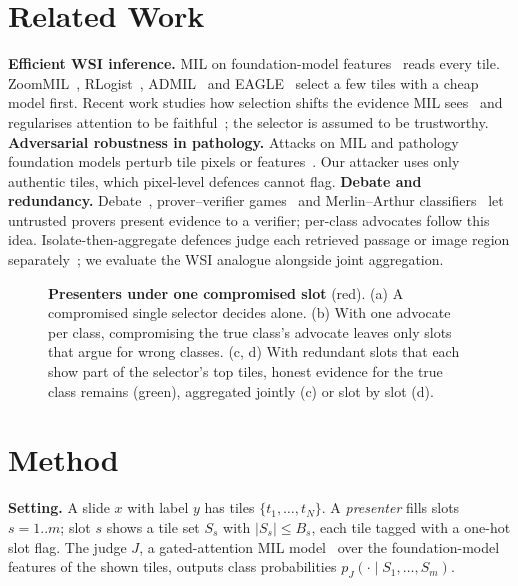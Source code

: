 \documentclass[runningheads]{llncs}
\begin{document}
\section{Related Work}
\textbf{Efficient WSI inference.} MIL on foundation-model features~\cite{ilse2018abmil,lu2021data,shao2021transmil,li2021dual} reads every tile. ZoomMIL~\cite{thandiackal2022zoommil}, RLogist~\cite{zhao2023rlogist}, ADMIL~\cite{admil2026} and EAGLE~\cite{eagle2026} select a few tiles with a cheap model first. Recent work studies how selection shifts the evidence MIL sees~\cite{bagshift2026,foci2026} and regularises attention to be faithful~\cite{gcemil2026,carmil2026}; the selector is assumed to be trustworthy.
\textbf{Adversarial robustness in pathology.} Attacks on MIL and pathology foundation models perturb tile pixels or features~\cite{foote2021now,mil_adv2022,butterfly2025}. Our attacker uses only authentic tiles, which pixel-level defences cannot flag.
\textbf{Debate and redundancy.} Debate~\cite{irving2018debate,khan2024debate}, prover--verifier games~\cite{anil2021pvg} and Merlin--Arthur classifiers~\cite{waldchen2024merlin} let untrusted provers present evidence to a verifier; per-class advocates follow this idea. Isolate-then-aggregate defences judge each retrieved passage or image region separately~\cite{xiang2024robustrag,xiang2022patchcleanser}; we evaluate the WSI analogue alongside joint aggregation.

\begin{figure}[t]\centering
\resizebox{\textwidth}{!}{}
\caption{\textbf{Presenters under one compromised slot} (red). (a) A compromised single selector decides alone. (b) With one advocate per class, compromising the true class's advocate leaves only slots that argue for wrong classes. (c, d) With redundant slots that each show part of the selector's top tiles, honest evidence for the true class remains (green), aggregated jointly (c) or slot by slot (d).}\label{fig:method}
\end{figure}

\section{Method}
\textbf{Setting.} A slide $x$ with label $y$ has tiles $\{t_1,\dots,t_N\}$. A \emph{presenter} fills slots $s=1..m$; slot $s$ shows a tile set $S_s$ with $|S_s|\le B_s$, each tile tagged with a one-hot slot flag. The judge $J$, a gated-attention MIL model~\cite{ilse2018abmil} over the foundation-model features of the shown tiles, outputs class probabilities $p_J(\cdot\mid S_1,\dots,S_m)$.
\end{document}
